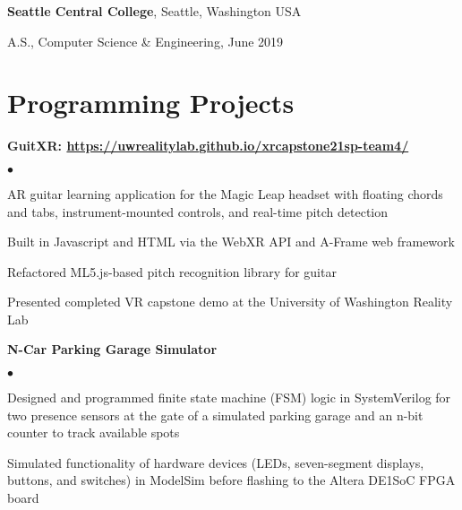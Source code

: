 \documentclass[margin,line]{res}
\newenvironment{list1}{
  \begin{list}{\ding{113}}{%
      \setlength{\itemsep}{0in}
      \setlength{\parsep}{0in} \setlength{\parskip}{0in}
      \setlength{\topsep}{0in} \setlength{\partopsep}{0in} 
      \setlength{\leftmargin}{0.17in}}}{\end{list}}
\newenvironment{list2}{
  \begin{list}{$\bullet$}{%
      \setlength{\itemsep}{0in}
      \setlength{\parsep}{0in} \setlength{\parskip}{0in}
      \setlength{\topsep}{0in} \setlength{\partopsep}{0in} 
      \setlength{\leftmargin}{0.2in}}}{\end{list}}
\begin{document}
\begin{resume}
{\bf Seattle Central College}, Seattle, Washington USA %
\\

\vspace*{-.3cm}
\begin{list1}
\item[] A.S., Computer Science \& Engineering, June 2019
\end{list1}

\section{\sc Programming Projects}


{\bf GuitXR: \url{https://uwrealitylab.github.io/xrcapstone21sp-team4/}} %
\begin{list2}
\item AR guitar learning application for the Magic Leap headset with floating chords and tabs, instrument-mounted controls, and real-time pitch detection
\item Built in Javascript and HTML via the WebXR API and A-Frame web framework
\item Refactored ML5.js-based pitch recognition library for guitar 
\item Presented completed VR capstone demo at the University of Washington Reality Lab
\end{list2}

{\bf N-Car Parking Garage Simulator}
\begin{list2}
\item Designed and programmed finite state machine (FSM) logic in SystemVerilog for two presence sensors at the gate of a simulated parking garage and an n-bit counter to track available spots
\item Simulated functionality of hardware devices (LEDs, seven-segment displays, buttons, and switches) in ModelSim before flashing to the Altera DE1{\textunderscore}SoC FPGA board
\end{list2}



\end{resume}
\end{document}
